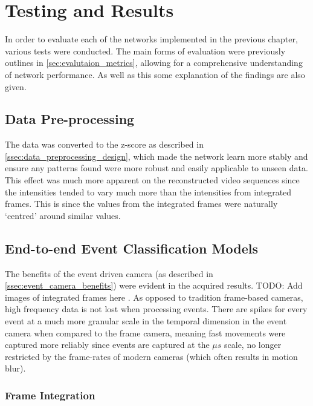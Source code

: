 \chapter{Testing and Results} \label{chap:testing_and_results}

In order to evaluate each of the networks implemented in the previous chapter, various tests were conducted. The main forms of evaluation were previously outlines in \cref{sec:evalutaion_metrics}, allowing for a comprehensive understanding of network performance. As well as this some explanation of the findings are also given.

\section{Data Pre-processing}

The data was converted to the z-score as described in \cref{ssec:data_preprocessing_design}, which made the network learn more stably and ensure any patterns found were more robust and easily applicable to unseen data. This effect was much more apparent on the reconstructed video sequences since the intensities tended to vary much more than the intensities from integrated frames. This is since the values from the integrated frames were naturally `centred' around similar values.

\section{End-to-end Event Classification Models}

The benefits of the event driven camera (as described in \cref{ssec:event_camera_benefits}) were evident in the acquired results. \color{red} TODO: Add images of integrated frames here \color{black}. As opposed to tradition frame-based cameras, high frequency data is not lost when processing events. There are spikes for every event at a much more granular scale in the temporal dimension in the event camera when compared to the frame camera, meaning fast movements were captured more reliably since events are captured at the $\mu s$ scale, no longer restricted by the frame-rates of modern cameras (which often results in motion blur).

\subsection{Frame Integration}

